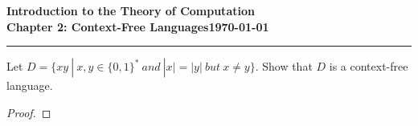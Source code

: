 \documentclass[11pt]{article}
\newcommand{\dated}{\today}
\begin{document}
\textbf{Introduction to the Theory of
Computation}\hfill\textbf{\myname}\\[0.01in]
\textbf{Chapter 2: Context-Free Languages}\hfill\textbf{\dated}\\
\smallskip\hrule\bigskip

\begin{problem}{2.22}
Let $D = \{xy \ | \ x, y \in \{0,1\}^{*} \ and \ |x|=|y| \ but \ x \neq y \}$. Show that $D$ is a context-free language.
\end{problem}

\begin{idea}
\end{idea}

\begin{proof}
\end{proof}
\end{document}
